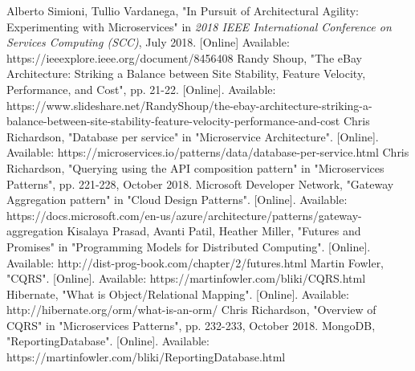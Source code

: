 \documentclass[conference]{IEEEtran}
\begin{document}

%
%
%
\begin{thebibliography}{1}

Alberto Simioni, Tullio Vardanega, "In Pursuit of Architectural Agility: Experimenting with Microservices" in \textit{2018 IEEE International Conference on Services Computing (SCC)}, July 2018. [Online] Available: https://ieeexplore.ieee.org/document/8456408
Randy Shoup, "The eBay Architecture: Striking a Balance between Site Stability, Feature Velocity, Performance, and Cost", pp. 21-22. [Online]. Available: https://www.slideshare.net/RandyShoup/the-ebay-architecture-striking-a-balance-between-site-stability-feature-velocity-performance-and-cost
Chris Richardson, "Database per service" in "Microservice Architecture". [Online]. Available: https://microservices.io/patterns/data/database-per-service.html
Chris Richardson, "Querying using the API composition pattern" in "Microservices Patterns", pp. 221-228, October 2018.
Microsoft Developer Network, "Gateway Aggregation pattern" in "Cloud Design Patterns". [Online]. Available: https://docs.microsoft.com/en-us/azure/architecture/patterns/gateway-aggregation
Kisalaya Prasad, Avanti Patil, Heather Miller, "Futures and Promises" in "Programming Models for Distributed Computing". [Online]. Available: http://dist-prog-book.com/chapter/2/futures.html
Martin Fowler, "CQRS". [Online]. Available: https://martinfowler.com/bliki/CQRS.html
Hibernate, "What is Object/Relational Mapping". [Online]. Available: http://hibernate.org/orm/what-is-an-orm/
Chris Richardson, "Overview of CQRS" in "Microservices Patterns", pp. 232-233, October 2018.
MongoDB, "ReportingDatabase". [Online]. Available: https://martinfowler.com/bliki/ReportingDatabase.html

\end{thebibliography}
\end{document}

